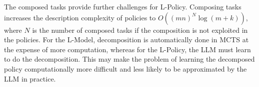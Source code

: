 

The composed tasks provide further challenges for L-Policy. Composing tasks increases the description complexity of policies to $O((mn)^N\log (m+k))$, where $N$ is the number of composed tasks if the composition is not exploited in the policies. 
For the L-Model, decomposition is automatically done in MCTS at the expense of more computation, whereas for the L-Policy, the LLM must learn to do the decomposition. This may make the problem of learning the decomposed policy computationally more difficult and less likely to be approximated by the LLM in practice.

